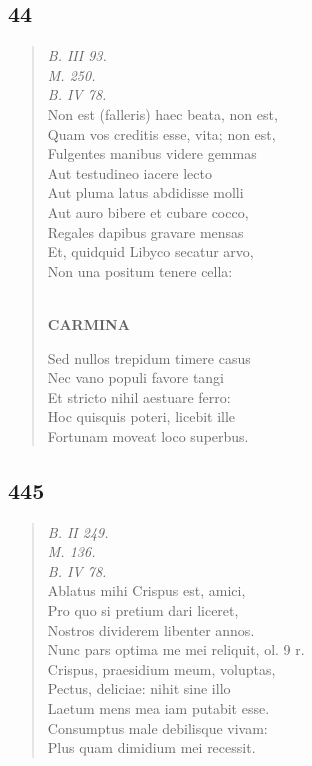 \documentclass[11pt, a4paper]{report}
\begin{document}
            \subsection*{44}
      \begin{verse}
      \textit{B. III 93.} \\ \textit{M. 250.} \\ \textit{B. IV 78.} \\ Non est (falleris) haec beata, non est, \\ Quam vos creditis esse, vita; non est, \\ Fulgentes manibus videre gemmas \\ Aut testudineo iacere lecto \\ Aut pluma latus abdidisse molli \\ Aut auro bibere et cubare cocco, \\ Regales dapibus gravare mensas \\ Et, quidquid Libyco secatur arvo, \\ Non una positum tenere cella: \\ 
        ﻿\pagebreak 
    \begin{center} \textbf{CARMINA} \end{center} \marginpar{[334]} Sed nullos trepidum timere casus \\ Nec vano populi favore tangi \\ Et stricto nihil aestuare ferro: \\ Hoc quisquis poteri, licebit ille \\ Fortunam moveat loco superbus. \\ 
      \end{verse}
  
            \subsection*{445}
      \begin{verse}
      \textit{B. II 249.} \\ \textit{M. 136.} \\ \textit{B. IV 78.} \\ Ablatus mihi Crispus est, amici, \\ Pro quo si pretium dari liceret, \\ Nostros dividerem libenter annos. \\ Nunc pars optima me mei reliquit, ol. 9 r. \\ Crispus, praesidium meum, voluptas, \\ Pectus, deliciae: nihit sine illo \\ Laetum mens mea iam putabit esse. \\ Consumptus male debilisque vivam: \\ Plus quam dimidium mei recessit. \\ 
      \end{verse}
  
\end{document}
